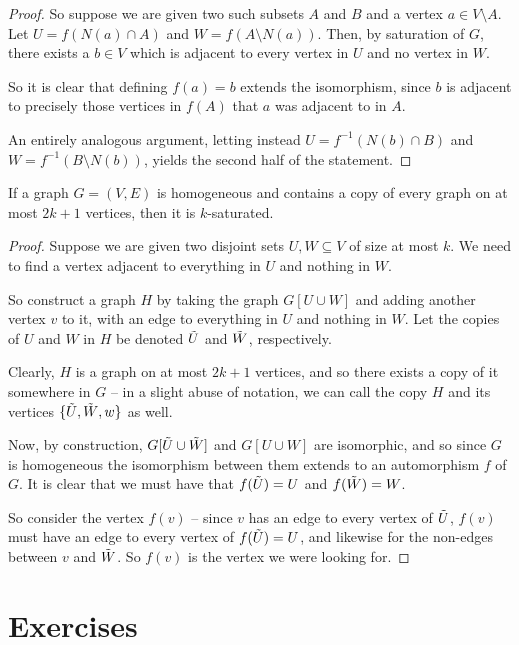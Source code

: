 \documentclass[nobib]{tufte-handout}
\begin{document}
\begin{lemma}
\begin{proof}
        So suppose we are given two such subsets $A$ and $B$ and a vertex $a \in V \setminus A$. Let $U = f\left(N(a) \cap A\right)$ and $W = f\left(A \setminus N(a)\right)$. Then, by saturation of $G$, there exists a $b \in V$ which is adjacent to every vertex in $U$ and no vertex in $W$.

        So it is clear that defining $f(a) = b$ extends the isomorphism, since $b$ is adjacent to precisely those vertices in $f(A)$ that $a$ was adjacent to in $A$.

        An entirely analogous argument, letting instead $U = f^{-1}\left(N(b) \cap B\right)$ and $W = f^{-1}\left(B \setminus N(b)\right)$, yields the second half of the statement.
    \end{proof}
\end{lemma}

\begin{lemma}
    If a graph $G = (V,E)$ is homogeneous and contains a copy of every graph on at most $2k + 1$ vertices, then it is $k$-saturated.

    \begin{proof}
        Suppose we are given two disjoint sets $U, W \subseteq V$ of size at most $k$. We need to find a vertex adjacent to everything in $U$ and nothing in $W$.

        So construct a graph $H$ by taking the graph $G[U \cup W]$ and adding another vertex $v$ to it, with an edge to everything in $U$ and nothing in $W$. Let the copies of $U$ and $W$ in $H$ be denoted $\Tilde U$ and $\Tilde W$, respectively.
        
        Clearly, $H$ is a graph on at most $2k + 1$ vertices, and so there exists a copy of it somewhere in $G$ -- in a slight abuse of notation, we can call the copy $H$ and its vertices $\{\Tilde U, \Tilde W, w\}$ as well.

        Now, by construction, $G[\Tilde U \cup \Tilde W]$ and $G[U \cup W]$ are isomorphic, and so since $G$ is homogeneous the isomorphism between them extends to an automorphism $f$ of $G$. It is clear that we must have that $f(\Tilde U) = U$ and $f(\Tilde W) = W$.

        So consider the vertex $f(v)$ -- since $v$ has an edge to every vertex of $\Tilde U$, $f(v)$ must have an edge to every vertex of $f(\Tilde U) = U$, and likewise for the non-edges between $v$ and $\Tilde W$. So $f(v)$ is the vertex we were looking for. 
    \end{proof}
\end{lemma}

\section{Exercises}


%
%
\end{document}

